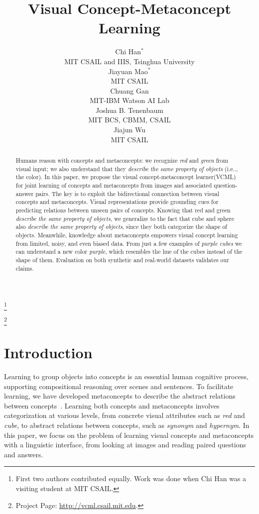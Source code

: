 \documentclass{article}
\title{Visual Concept-Metaconcept Learning}
\author{Chi Han$^*$\\
MIT CSAIL and IIIS, Tsinghua University\\
\And
Jiayuan Mao$^*$\\
MIT CSAIL\\
\And
Chuang Gan\\
MIT-IBM Watson AI Lab\\
\And
Joshua B. Tenenbaum\\
MIT BCS, CBMM, CSAIL\\
\And
Jiajun Wu\\
MIT CSAIL\\
}
\makeatletter
\newcommand\nnfootnote[1]{\begin{NoHyper}
  \renewcommand\thefootnote{}\footnote{#1}\addtocounter{footnote}{-1}\end{NoHyper}
}
\renewcommand*{\thefootnote}{\fnsymbol{footnote}}
\DeclareRobustCommand\onedot{\futurelet\@let@token\@onedot}
\def\@onedot{\ifx\@let@token.\else.\null\fi\xspace}
\def\ie{i.e\onedot} \def\Ie{I.e\onedot}
\newcommand{\modelfull}{visual concept-metaconcept learner\xspace}
\newcommand{\model}{VCML\xspace}
\makeatother
\begin{document}
\maketitle
\nnfootnote{First two authors contributed equally. Work was done when Chi Han was a visiting student at MIT CSAIL.}
\nnfootnote{Project Page: \url{http://vcml.csail.mit.edu}.}

\vspace{-2.5em}
\begin{abstract}
\vspace{-0.3em}
Humans reason with concepts and metaconcepts: we recognize {\it red} and {\it green} from visual input; we also understand that they {\it describe the same property of objects} (\ie, the color). In this paper, we propose the \modelfull (\model) for joint learning of concepts and metaconcepts from images and associated question-answer pairs. The key is to exploit the bidirectional connection between visual concepts and metaconcepts. Visual representations provide grounding cues for predicting relations between unseen pairs of concepts. Knowing that red and green {\it describe the same property of objects}, we generalize to the fact that cube and sphere also {\it describe the same property of objects}, since they both categorize the shape of objects. Meanwhile, knowledge about metaconcepts empowers visual concept learning from limited, noisy, and even biased data. 
From just a few examples of {\it purple cubes} we can understand a new color {\it purple}, which resembles the hue of the cubes instead of the shape of them.
Evaluation on both synthetic and real-world datasets validates our claims.



\end{abstract}
\section{Introduction}

Learning to group objects into concepts is an essential human cognitive process, supporting compositional reasoning over scenes and sentences. To facilitate learning, we have developed metaconcepts to describe the abstract relations between concepts~\citep{Speer2017Conceptnet,McRae2005Semantic}. Learning both concepts and metaconcepts involves categorization at various levels, from concrete visual attributes such as {\it red} and {\it cube}, to abstract relations between concepts, such as {\it synonym} and {\it hypernym}. In this paper, we focus on the problem of learning visual concepts and metaconcepts with a linguistic interface, from looking at images and reading paired questions and answers.
\end{document}
